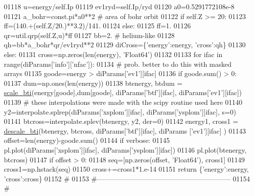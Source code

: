 \begin{DoxyCode}
01118         u=energy/self.Ip
01119         ev1ryd=self.Ip/ryd
01120         a0=0.5291772108e-8
01121         a\_bohr=const.pi*a0**2   \textcolor{comment}{# area of bohr orbit}
01122         \textcolor{keywordflow}{if} self.Z >= 20:
01123             ff=(140.+(self.Z/20.)**3.2)/141.
01124         \textcolor{keywordflow}{else}:
01125             ff=1.
01126         qr=util.qrp(self.Z,u)*ff
01127         bb=2.  \textcolor{comment}{# helium-like}
01128         qh=bb*a\_bohr*qr/ev1ryd**2
01129         diCross=\{\textcolor{stringliteral}{'energy'}:energy, \textcolor{stringliteral}{'cross'}:qh\}
01130     \textcolor{keywordflow}{else}:
01131         cross=np.zeros(len(energy), \textcolor{stringliteral}{'Float64'})
01132 
01133         \textcolor{keywordflow}{for} ifac \textcolor{keywordflow}{in} range(diParams[\textcolor{stringliteral}{'info'}][\textcolor{stringliteral}{'nfac'}]):
01134             \textcolor{comment}{# prob. better to do this with masked arrays}
01135             goode=energy > diParams[\textcolor{stringliteral}{'ev1'}][ifac]
01136             \textcolor{keywordflow}{if} goode.sum() > 0:
01137                 dum=np.ones(len(energy))
01138                 btenergy, btdum = \hyperlink{namespacepyneb_1_1utils_1_1__chianti__tools_a71b9295157832135424ea7dc0138fcd4}{scale\_bti}(energy[goode],dum[goode], diParams[\textcolor{stringliteral}{'btf'}][ifac], 
      diParams[\textcolor{stringliteral}{'ev1'}][ifac])
01139                 \textcolor{comment}{# these interpolations were made with the scipy routine used here}
01140                 y2=interpolate.splrep(diParams[\textcolor{stringliteral}{'xsplom'}][ifac], diParams[\textcolor{stringliteral}{'ysplom'}][ifac], s=0)
01141                 btcross=interpolate.splev(btenergy, y2, der=0)
01142                 energy1, cross1 = \hyperlink{namespacepyneb_1_1utils_1_1__chianti__tools_a47075ba90f01cbd7a3dbd08115544214}{descale\_bti}(btenergy, btcross, diParams[\textcolor{stringliteral}{'btf'}][ifac], diParams
      [\textcolor{stringliteral}{'ev1'}][ifac] )
01143                 offset=len(energy)-goode.sum()
01144                 \textcolor{keywordflow}{if} verbose:
01145                     pl.plot(diParams[\textcolor{stringliteral}{'xsplom'}][ifac], diParams[\textcolor{stringliteral}{'ysplom'}][ifac])
01146                     pl.plot(btenergy, btcross)
01147                 \textcolor{keywordflow}{if} offset > 0:
01148                     seq=[np.zeros(offset, \textcolor{stringliteral}{'Float64'}), cross1]
01149                     cross1=np.hstack(seq)
01150                 cross+=cross1*1.e-14
01151         \textcolor{keywordflow}{return} \{\textcolor{stringliteral}{'energy'}:energy, \textcolor{stringliteral}{'cross'}:cross\}
01152     \textcolor{comment}{#}
01153     \textcolor{comment}{#-----------------------------------------------------------}
01154     \textcolor{comment}{#}
\end{DoxyCode}
\hypertarget{namespacepyneb_1_1utils_1_1__chianti__tools_a5d55ad976e899b30719ac9b053e34ceb}{}
